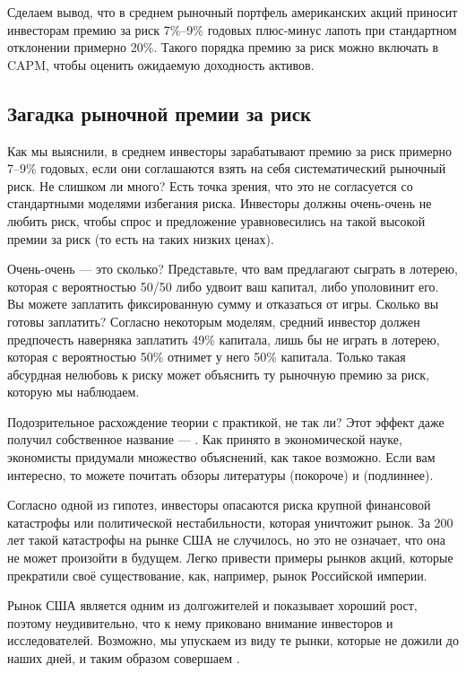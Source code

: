 Сделаем вывод, что в среднем рыночный портфель американских акций приносит 
инвесторам премию за риск 7\%--9\% годовых плюс-минус лапоть при стандартном 
отклонении примерно 20\%. Такого порядка премию за риск можно включать в CAPM, 
чтобы оценить ожидаемую доходность активов.

\subsection{Загадка рыночной премии за риск}

Как мы выяснили, в среднем инвесторы зарабатывают премию за риск примерно 7--9\%  
годовых, если они соглашаются взять на себя систематический рыночный риск. Не 
слишком ли много? Есть точка зрения, что это не согласуется со стандартными 
моделями избегания риска. Инвесторы должны очень-очень не любить риск, чтобы 
спрос и предложение уравновесились на такой высокой премии за риск (то есть на 
таких низких ценах).

Очень-очень --- это сколько? Представьте, что вам предлагают сыграть в лотерею, 
которая с вероятностью 50/50 либо удвоит ваш капитал, либо уполовинит его. Вы 
можете заплатить фиксированную сумму и отказаться от игры. Сколько вы готовы 
заплатить? Согласно некоторым моделям, средний инвестор должен предпочесть 
наверняка заплатить 49\% капитала, лишь бы не играть в лотерею, которая с 
вероятностью 50\% отнимет у него 50\% капитала. Только такая абсурдная нелюбовь 
к риску может объяснить ту рыночную премию за риск, которую мы наблюдаем.

Подозрительное расхождение теории с практикой, не так ли? Этот эффект даже 
получил собственное название --- . Как принято в экономической науке, экономисты придумали 
множество объяснений, как такое возможно. Если вам интересно, то можете почитать 
обзоры литературы \cite{siegel1997anomalies} (покороче) и \cite{mehra2007equity} 
(подлиннее).

Согласно одной из гипотез, инвесторы опасаются риска крупной финансовой 
катастрофы или политической нестабильности, которая уничтожит рынок. За 200 лет 
такой катастрофы на рынке США не случилось, но это не означает, что она не может 
произойти в будущем. Легко привести примеры рынков акций, которые прекратили 
своё существование, как, например, рынок Российской империи.

Рынок США является одним из долгожителей и показывает хороший рост, поэтому 
неудивительно, что к нему приковано внимание инвесторов и исследователей. 
Возможно, мы упускаем из виду те рынки, которые не дожили до наших дней, и таким 
образом совершаем .

